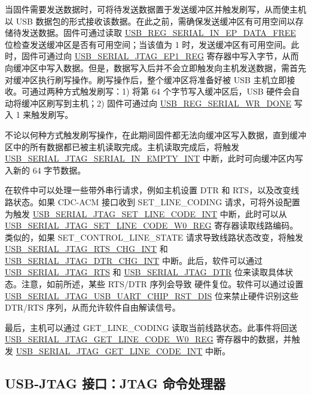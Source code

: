 \documentclass[main\_\_CN.tex]{subfiles}
\begin{document}
当固件需要发送数据时，可将待发送数据置于发送缓冲区并触发刷写，从而使主机以 USB 数据包的形式接收该数据。在此之前，需确保发送缓冲区有可用空间以存储待发送数据。固件可通过读取 \hyperref[fielddesc:USBSERIALJTAGSERIALINEPDATAFREE]{USB\_REG\_SERIAL\_IN\_EP\_DATA\_FREE} 位检查发送缓冲区是否有可用空间；当该值为 1 时，发送缓冲区有可用空间。此时，固件可通过向 \hyperref[fielddesc:USBSERIALJTAGRDWRBYTE]{USB\_SERIAL\_JTAG\_EP1\_REG} 寄存器中写入字节，从而向缓冲区中写入数据。但是，数据写入后并不会立即触发向主机发送数据，需首先对缓冲区执行刷写操作。刷写操作后，整个缓冲区将准备好被 USB 主机立即接收。可通过两种方式触发刷写：1) 将第 64 个字节写入缓冲区后，USB 硬件会自动将缓冲区刷写到主机；2) 固件可通过向 \hyperref[fielddesc:USBSERIALJTAGWRDONE]{USB\_REG\_SERIAL\_WR\_DONE} 写入 1 来触发刷写。

不论以何种方式触发刷写操作，在此期间固件都无法向缓冲区写入数据，直到缓冲区中的所有数据都已被主机读取完成。主机读取完成后，将触发 \hyperref[fielddesc:USBSERIALJTAGSERIALINEMPTYINTRAW]{USB\_SERIAL\_JTAG\_SERIAL\_IN\_EMPTY\_INT} 中断，此时可向缓冲区内写入新的 64 字节数据。

在软件中可以处理一些带外串行请求，例如主机设置 DTR 和 RTS，以及改变线路状态。如果 CDC-ACM 接口收到 SET\_LINE\_CODING 请求，可将外设配置为触发 \hyperref[int:USBSERIALJTAGSETLINECODEINT]{USB\_SERIAL\_JTAG\_SET\_LINE\_CODE\_INT} 中断，此时可以从 \hyperref[regdesc:USBSERIALJTAGSETLINECODEW0REG]{USB\_SERIAL\_JTAG\_SET\_LINE\_CODE\_W0\_REG} 寄存器读取线路编码。类似的，如果 SET\_CONTROL\_LINE\_STATE 请求导致线路状态改变，将触发 \hyperref[int:USBSERIALJTAGRTSCHGINT]{USB\_SERIAL\_JTAG\_RTS\_CHG\_INT} 和 \hyperref[int:USBSERIALJTAGDTRCHGINT]{USB\_SERIAL\_JTAG\_DTR\_CHG\_INT} 中断。此后，软件可以通过 \hyperref[fielddesc:USBSERIALJTAGRTS]{USB\_SERIAL\_JTAG\_RTS} 和 \hyperref[fielddesc:USBSERIALJTAGDTR]{USB\_SERIAL\_JTAG\_DTR} 位来读取具体状态。注意，如前所述，某些 RTS/DTR 序列会导致 \chipname{} 硬件复位。软件可以通过设置 \hyperref[fielddesc:USBSERIALJTAGUSBUARTCHIPRSTDIS]{USB\_SERIAL\_JTAG\_USB\_UART\_CHIP\_RST\_DIS} 位来禁止硬件识别这些 DTR/RTS 序列，从而允许软件自由解读信号。

最后，主机可以通过 GET\_LINE\_CODING 读取当前线路状态。此事件将回送 \hyperref[regdesc:USBSERIALJTAGGETLINECODEW0REG]{USB\_SERIAL\_JTAG\_GET\_LINE\_CODE\_W0\_REG} 寄存器中的数据，并触发 \hyperref[int:USBSERIALJTAGGETLINECODEINT]{USB\_SERIAL\_JTAG\_GET\_LINE\_CODE\_INT} 中断。


\subsection{USB-JTAG 接口：JTAG 命令处理器}    
\end{document}
